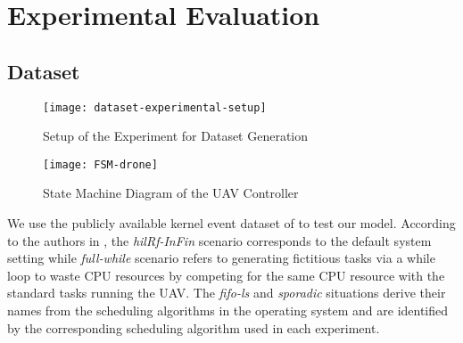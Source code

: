 \section{Experimental Evaluation}
\label{sec:experiments}
\subsection{Dataset}
\begin{figure}[!t]
	\centering
	\texttt{[image: dataset-experimental-setup]}
	\caption{Setup of the Experiment for Dataset Generation}
	\label{fig:setup}
\end{figure}

\begin{figure}[!t]
	\centering
	\texttt{[image: FSM-drone]}
	\caption{State Machine Diagram of the UAV Controller}
	\label{fig:FSM}
\end{figure}
We use the publicly available kernel event dataset of \cite{salem2016anomaly} 
to test our model. According to the authors in \cite{salem2016anomaly}, the 
\emph{hilRf-InFin} scenario corresponds to the default system setting while 
\emph{full-while} scenario refers to generating fictitious tasks via a while 
loop to waste CPU resources by competing for the same CPU resource with the 
standard tasks running the UAV. The \emph{fifo-ls} and \emph{sporadic} 
situations derive their names from the scheduling algorithms in the operating 
system and are identified by the corresponding scheduling algorithm used in 
each experiment. 

